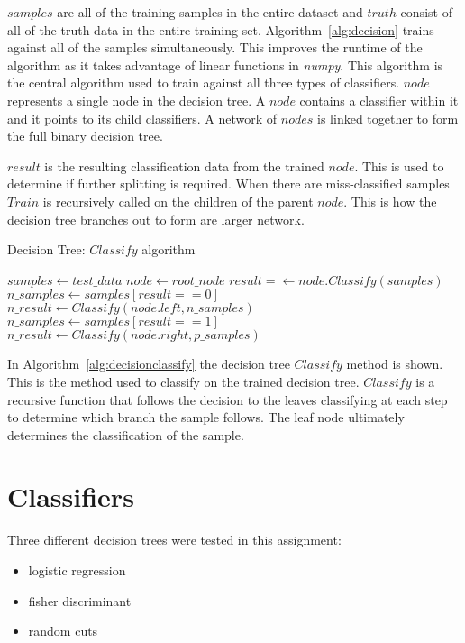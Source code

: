 \documentclass[letterpaper]{article}
\begin{document}
$samples$ are all of the training samples in the entire dataset and $truth$ consist of all of the truth data in the entire training set. Algorithm~\ref{alg:decision} trains against all of the samples simultaneously. This improves the runtime of the algorithm as it takes advantage of linear functions in \emph{numpy}. This algorithm is the central algorithm used to train against all three types of classifiers. $node$ represents a single node in the decision tree. A $node$ contains a classifier within it and it points to its child classifiers. A network of $nodes$ is linked together to form the full binary decision tree. 

$result$ is the resulting classification data from the trained $node$. This is used to determine if further splitting is required. When there are miss-classified samples $Train$ is recursively called on the children of the parent $node$. This is how the decision tree branches out to form are larger network.

\begin{algorithm}
\caption{Decision Tree: $Classify$ algorithm}
\label{alg:decisionclassify}
\begin{algorithmic}[1]
\STATE $samples \leftarrow test\_data$
\STATE $node \leftarrow root\_node$
\STATE $result = \leftarrow node.Classify(samples)$
\STATE $n\_samples \leftarrow samples[result == 0]$
\STATE $n\_result \leftarrow Classify(node.left, n\_samples)$
\ENDIF
{}
\STATE $n\_samples \leftarrow samples[result == 1]$
\STATE $n\_result \leftarrow Classify(node.right, p\_samples)$
\ENDIF
\end{algorithmic}
\end{algorithm}

In Algorithm~\ref{alg:decisionclassify} the decision tree $Classify$ method is shown. This is the method used to classify on the trained decision tree. $Classify$ is a recursive function that follows the decision to the leaves classifying at each step to determine which branch the sample follows. The leaf node ultimately determines the classification of the sample.

\section{Classifiers}
Three different decision trees were tested in this assignment:
\begin{itemize}
\item logistic regression
\item fisher discriminant
\item random cuts
\end{itemize}
\end{document}
